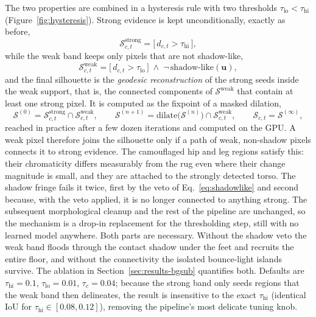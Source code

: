 The two properties are combined in a hysteresis rule with two thresholds
$\tau_{\text{lo}} < \tau_{\text{hi}}$ (Figure~\ref{fig:hysteresis}). Strong evidence is
kept unconditionally, exactly as before,
\begin{equation}
    \mathcal{S}^{\text{strong}}_{c,t} = \big[\, d_{c,t} > \tau_{\text{hi}} \,\big],
\end{equation}
while the weak band keeps only pixels that are not shadow-like,
\begin{equation}
    \mathcal{S}^{\text{weak}}_{c,t} = \big[\, d_{c,t} > \tau_{\text{lo}} \,\big]
    \;\wedge\; \neg\,\text{shadow-like}(\mathbf{u}),
    \label{eq:weakband}
\end{equation}
and the final silhouette is the \emph{geodesic reconstruction} of the strong seeds
inside the weak support, that is, the connected components of
$\mathcal{S}^{\text{weak}}$ that contain at least one strong pixel. It is computed as
the fixpoint of a masked dilation,
\begin{equation}
    \mathcal{S}^{(0)} = \mathcal{S}^{\text{strong}}_{c,t} \cap \mathcal{S}^{\text{weak}}_{c,t},
    \qquad
    \mathcal{S}^{(n+1)} = \mathrm{dilate}\big(\mathcal{S}^{(n)}\big) \cap \mathcal{S}^{\text{weak}}_{c,t},
    \qquad
    \mathcal{S}_{c,t} = \mathcal{S}^{(\infty)},
    \label{eq:geodesic}
\end{equation}
reached in practice after a few dozen iterations and computed on the GPU. A weak
pixel therefore joins the silhouette only if a path of weak, non-shadow pixels
connects it to strong evidence. The camouflaged hip and leg regions satisfy this:
their chromaticity differs measurably from the rug even where their change magnitude
is small, and they are attached to the strongly detected torso. The shadow fringe
fails it twice, first by the veto of Eq.~\eqref{eq:shadowlike} and second because,
with the veto applied, it is no longer connected to anything strong. The subsequent
morphological cleanup and the rest of the pipeline are unchanged, so the mechanism is
a drop-in replacement for the thresholding step, still with no learned model anywhere.
Both parts are necessary. Without the shadow veto the weak band floods through the
contact shadow under the feet and recruits the entire floor, and without the
connectivity the isolated bounce-light islands survive. The ablation in
Section~\ref{sec:results-bgsub} quantifies both. Defaults are
$\tau_{\text{hi}} = 0.1$, $\tau_{\text{lo}} = 0.01$, $\tau_c = 0.04$; because the
strong band only seeds regions that the weak band then delineates, the result is
insensitive to the exact $\tau_{\text{hi}}$ (identical IoU for
$\tau_{\text{hi}} \in [0.08, 0.12]$), removing the pipeline's most delicate tuning
knob.

